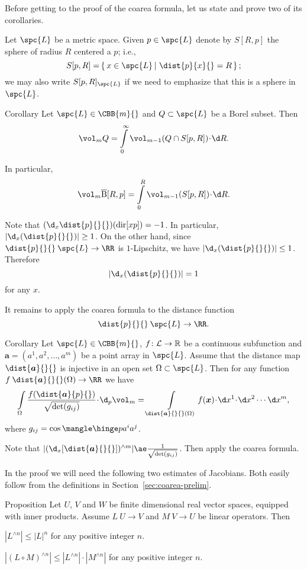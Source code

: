 Before getting to the proof of the coarea formula,
let us state and prove two of its corollaries.

Let $\spc{L}$ be a metric space.
Given $p\in \spc{L}$ denote by $S[R,p]$
the sphere of radius $R$ centered a $p$;
i.e.,
\[S[p,R]=\set{x\in\spc{L}}{\dist{p}{x}{}=R};\]
we may also write $S[p,R]_{\spc{L}}$ if we need to emphasize 
that this is a sphere in $\spc{L}$.


\begin{thm}{Corollary}\label{cor:coarea-for-dist-function}
Let $\spc{L}\in\CBB{m}{}$
and $Q\subset\spc{L}$ be a Borel subset.
Then 
\[\vol_m Q=\int\limits_0^\infty\vol_{m-1}(Q\cap S[p,R])\cdot\d R.\]

In particular,
\[\vol_m \cBall[R,p]=\int\limits_0^R\vol_{m-1}(S[p,R])\cdot\d R.\]


\end{thm}

Note that
$(\d_x\dist{p}{}{})(\dir xp)=-1$.
In particular, $|\d_x(\dist{p}{}{})|\ge 1$.
On the other hand, since $\dist{p}{}{}\:\spc{L}\to\RR$ is $1$-Lipschitz,
we have
$|\d_x(\dist{p}{}{})|\le 1$.
Therefore
\[|\d_x(\dist{p}{}{})|= 1\] 
for any $x$.

It remains to apply the coarea formula to the distance function 
\[\dist{p}{}{}\:\spc{L}\to\RR.\]
\qedsf

\begin{thm}{Corollary}\label{cor:coarea-for-dist-map}
Let $\spc{L}\in\CBB{m}{}$,
$f\:\spc{L}\to\RR$ be a continuous subfunction
and $\bm{a}=(a^1,a^2,\dots,a^m)$ be a point array in $\spc{L}$.
Assume that the distance map $\dist{\bm{a}}{}{}$ 
 is injective in an open set $\Omega\subset\spc{L}$.
Then for any function $f\:\dist{\bm{a}}{}{}(\Omega)\to\RR$ 
we have
\[\int\limits_{\Omega} \frac{f(\dist{\bm{a}}{p}{})}{\sqrt{\det(g_{ij})}}\cdot\d_p\vol_m
=
\int\limits_{\dist{\bm{a}}{}{}(\Omega)} f(\bm{x})\cdot\d x^1\cdot\d x^2\cdots\d x^m,\]
where $g_{ij}=\cos\mangle\hinge p{a^i}{a^j}$.
\end{thm}

Note that $|(\d_x[\dist{\bm{a}}{}{}])^{\wedge m}|\ae \frac1{\sqrt{\det(g_{ij})}}$.
Then apply the coarea formula.
\qeds

In the proof we will need the following two estimates of Jacobians.
Both easily follow from the definitions in Section~\ref{sec:coarea-prelim}.

\begin{thm}{Proposition}\label{prop:lin-algebra-1}
Let $U$, $V$ and $W$ 
be finite dimensional real vector spaces, equipped with inner products.
Assume $L\:U\to V$ and $M\: V\to U$ be linear operators.
Then 
\begin{subthm}{}
$|L^{\wedge n}|\le |L|^{ n}$ for any positive integer $n$.
\end{subthm}

\begin{subthm}{}
$|(L\circ M)^{\wedge n}|\le |L^{\wedge n}|\cdot |M^{\wedge n}|$ for any positive integer $n$.
\end{subthm}

\end{thm}


